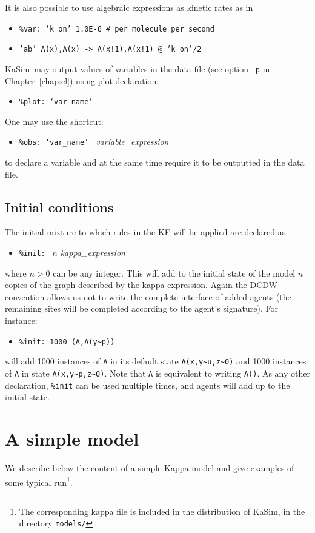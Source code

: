 \documentclass[11pt]{book}
\def\KaSim{\textsf{KaSim}}
\def\int{\hbox{\texttt{\~}}}
\def\ttt#1{\texttt{#1}}
\def\noi{\noindent}
\def\ITE#1{\begin{itemize}#1\end{itemize}}
\begin{document}
\vskip 0.25cm
\noi It is also possible to use algebraic expressions as kinetic rates as in
\ITE{
\item[] \ttt{\%var: `k\_on' 1.0E-6 \# per molecule per second}
\item[] \ttt{'ab' A(x),A(x) -> A(x!1),A(x!1) @ `k\_on'/2}
}
\KaSim~may output values of variables in the data file (see option \ttt{-p} in Chapter~\ref{chap:cl}) using plot declaration:
\ITE{
\item[] \ttt{\%plot: `var\_name'}
}
One may use the shortcut: 
\ITE{
\item[] \ttt{\%obs: `var\_name' } \textit{variable\_expression}
}
to declare a variable and at the same time require it to be outputted in the data file. 

\section{Initial conditions}\label{sec:init}

The initial mixture to which rules in the KF will be applied are declared as
\ITE{
\item[] \ttt{\%init: } $n$ \textit{kappa\_expression}
}
where $n>0$ can be any integer. This will add to the initial state of the model $n$ copies of the graph described by the kappa expression. Again the DCDW convention allows us not to write the complete interface of added agents (the remaining sites will be completed according to the agent's signature). For instance:
\ITE{
\item[] \ttt{\%init: 1000 (A,A(y\int p)) }
}
will add 1000 instances of \ttt{A} in its default state \ttt{A(x,y\int u,z\int 0)} and 1000 instances of \ttt{A} in state \ttt{A(x,y\int p,z\int 0)}.
Note that \ttt{A} is equivalent to writing \ttt{A()}. As any other declaration, \ttt{\%init} can be used multiple times, and agents will add up to the initial state.

\chapter{A simple model}\label{chap:abc}

We describe below the content of a simple Kappa model and give examples of some typical run\footnote{The corresponding kappa file is included in the distribution of \KaSim, in the directory \ttt{models/}}.
\end{document}
